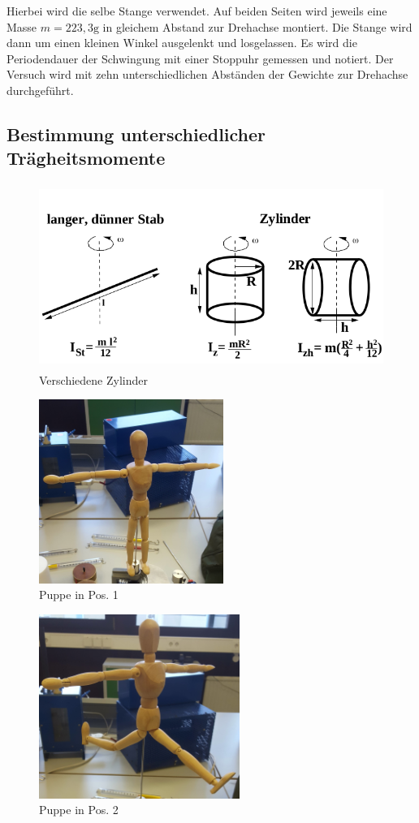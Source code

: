 Hierbei wird die selbe Stange verwendet. Auf beiden Seiten wird jeweils eine Masse $m=223,3\si{\gram}$ in gleichem Abstand zur 
Drehachse montiert. Die Stange wird dann um einen kleinen Winkel ausgelenkt und losgelassen. Es wird die Periodendauer der Schwingung
mit einer Stoppuhr gemessen und notiert. Der Versuch wird mit zehn unterschiedlichen Abständen der Gewichte zur Drehachse durchgeführt.

\subsection{Bestimmung unterschiedlicher Trägheitsmomente}
\begin{figure}
    \centering
    \includegraphics[height=6cm]{data/Probekoerper}
    \caption{Verschiedene Zylinder}
    \label{fig:Probekoerper}
\end{figure}


\begin{figure}
    \centering
    \includegraphics[height=6cm]{data/puppe_2}
    \caption{Puppe in Pos. 1}
    \label{fig:puppe_2}
\end{figure}

\begin{figure}
    \centering
    \includegraphics[height=6cm]{data/puppe_1}
    \caption{Puppe in Pos. 2}
    \label{fig:puppe_1}
\end{figure}



